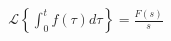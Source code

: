 \documentclass[preview]{standalone}
\begin{document}
\begin{align*}
\mathcal{L}\left\{\int_0^t f(\tau)d\tau\right\} = \frac{F(s)}{s}
\end{align*}
\end{document}
